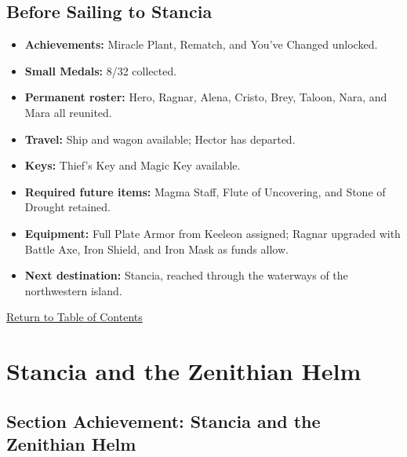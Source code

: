 \documentclass[
  american,
  10pt,
  letterpaper,
  oneside,
  open=any]{scrreprt}
\providecommand{\tightlist}{%
  \setlength{\itemsep}{0pt}\setlength{\parskip}{0pt}}
\begin{document}
\section{Before Sailing to Stancia}\label{before-sailing-to-stancia}

\begin{itemize}
\tightlist
\item
  \textbf{Achievements:} Miracle Plant, Rematch, and You've Changed
  unlocked.
\item
  \textbf{Small Medals:} 8/32 collected.
\item
  \textbf{Permanent roster:} Hero, Ragnar, Alena, Cristo, Brey, Taloon,
  Nara, and Mara all reunited.
\item
  \textbf{Travel:} Ship and wagon available; Hector has departed.
\item
  \textbf{Keys:} Thief's Key and Magic Key available.
\item
  \textbf{Required future items:} Magma Staff, Flute of Uncovering, and
  Stone of Drought retained.
\item
  \textbf{Equipment:} Full Plate Armor from Keeleon assigned; Ragnar
  upgraded with Battle Axe, Iron Shield, and Iron Mask as funds allow.
\item
  \textbf{Next destination:} Stancia, reached through the waterways of
  the northwestern island.
\end{itemize}

\hyperref[table-of-contents]{Return to Table of Contents}

\chapter{Stancia and the Zenithian
Helm}\label{stancia-and-the-zenithian-helm}

\section{Section Achievement: Stancia and the Zenithian
Helm}\label{section-achievement-stancia-and-the-zenithian-helm}
\end{document}
